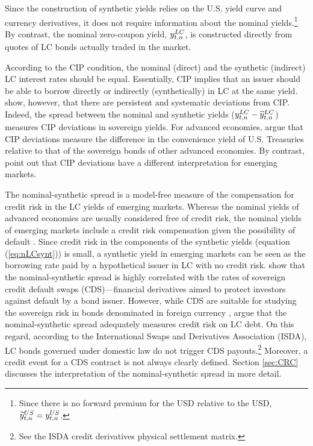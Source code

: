 {Since the construction of synthetic yields relies on the U.S. yield curve and currency derivatives, it does not require information about the nominal yields.\footnote{ Since there is no forward premium for the USD relative to the USD, \(\widetilde{y}_{t,n} ^{US} = y_{t,n} ^{US}\).} By contrast, the nominal zero-coupon yield, \(y_{t,n} ^{LC}\), is constructed directly from quotes of LC bonds actually traded in the market.

According to the CIP condition, the nominal (direct) and the synthetic (indirect) LC interest rates should be equal. 
Essentially, CIP implies that an issuer should be able to borrow directly or indirectly (synthetically) in LC at the same yield. 
\cite{DuTepperVerdelhan:2018} show, however, that there are persistent and systematic deviations from CIP. 
Indeed, the spread between the nominal and synthetic yields (\(y_{t,n} ^{LC} - \widetilde{y}_{t,n} ^{LC}\)) measures CIP deviations in sovereign yields.
For advanced economies, \cite{DuImSchreger:2018JIE} argue that CIP deviations measure the difference in the convenience yield of U.S. Treasuries relative to that of the sovereign bonds of other advanced economies.
By contrast, \cite{DuSchreger:2016JoF} point out that CIP deviations have a different interpretation for emerging markets. 

The nominal-synthetic spread is a model-free measure of the compensation for credit risk in the LC yields of emerging markets. 
Whereas the nominal yields of advanced economies are usually considered free of credit risk, the nominal yields of emerging markets include a credit risk compensation given the possibility of default \citep{DuSchreger:2016JoF,DuSchreger:2017WP}. 
Since credit risk in the components of the synthetic yields (equation (\ref{eq:nLCsynt})) is small, a synthetic yield in emerging markets can be seen as the borrowing rate paid by a hypothetical issuer in LC with no credit risk. 
\cite{DuSchreger:2016JoF} show that the nominal-synthetic spread is highly correlated with the rates of sovereign credit default swaps (CDS)---financial derivatives aimed to protect investors against default by a bond issuer. 
However, while CDS are suitable for studying the sovereign risk in bonds denominated in foreign currency \cite[see, for example,][]{Longstaffetal:2011}, \cite{DuSchreger:2016JoF} argue that the nominal-synthetic spread adequately measures credit risk on LC debt. 
On this regard, according to the International Swaps and Derivatives Association (ISDA), LC bonds governed under domestic law do not trigger CDS payouts.\footnote{ See the ISDA credit derivatives physical settlement matrix.} 
Moreover, a credit event for a CDS contract is not always clearly defined. 
Section \ref{sec:CRC} discusses the interpretation of the nominal-synthetic spread in more detail.


}
